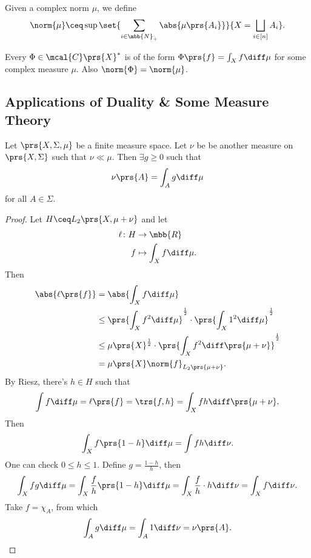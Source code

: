 \documentclass[10pt, twoside]{book}
\begin{document}
\begin{definition}
Given a complex norm $\mu$, we define
\[\norm{\mu} \ceq \sup\set{\sum_{i \in \mbb{N}_+} \abs{\mu\prs{A_i}}}{X = \bigsqcup_{i \in [n]} A_i} \text{.}\]
\end{definition}

\begin{theorem}
Every $\Phi \in \mcal{C}\prs{X}^*$ is of the form $\Phi\prs{f} = \int_X f \diff \mu$ for some complex measure $\mu$. Also
$\norm{\Phi} = \norm{\mu}$.
\end{theorem}

\subsection{Applications of Duality \& Some Measure Theory}

\begin{theorem}
Let $\prs{X, \Sigma, \mu}$ be a finite measure space. Let $\nu$ be be another measure on $\prs{X, \Sigma}$ such that $\nu \ll \mu$. Then $\exists g \geq 0$ such that
\[\nu\prs{A} = \int_A g \diff \mu\]
for all $A \in \Sigma$.
\end{theorem}

\begin{proof}
Let $H \ceq L_2\prs{X, \mu+\nu}$ and let
\begin{align*}
\ell \colon H &\to \mbb{R} \\
f &\mapsto \int_X f \diff \mu \text{.}
\end{align*}
Then
\begin{align*}
\abs{\ell\prs{f}} &=
\abs{\int_X f \diff \mu}
\\&\leq
\prs{\int_X f^2 \diff \mu}^{\frac{1}{2}} \cdot \prs{\int_X 1^2 \diff \mu}^{\frac{1}{2}}
\\&\leq
\mu\prs{X}^{\frac{1}{2}} \cdot \prs{\int_X f^2 \diff \prs{\mu + \nu}}^{\frac{1}{2}}
\\&=
\mu\prs{X} \norm{f}_{L_2\prs{\mu + \nu}} \text{.}
\end{align*}
By Riesz, there's $h \in H$ such that
\[\int f \diff \mu = \ell\prs{f} = \trs{f, h} = \int_X f h \diff \prs{\mu + \nu} \text{.}\]
Then \[\int_X f\prs{1-h} \diff \mu = \int f h \diff \nu \text{.}\]
One can check
$0 \leq h \leq 1$. Define $g = \frac{1-h}{h}$, then
\[\int_X fg \diff \mu = \int_X \frac{f}{h} \prs{1-h} \diff \mu = \int_X \frac{f}{h} \cdot h \diff \nu = \int_X f \diff \nu \text{.}\]
Take $f = \chi_A$, from which
\[\int_A g \diff \mu = \int_A 1 \diff \nu = \nu\prs{A} \text{.}\]
\end{proof}
\end{document}
